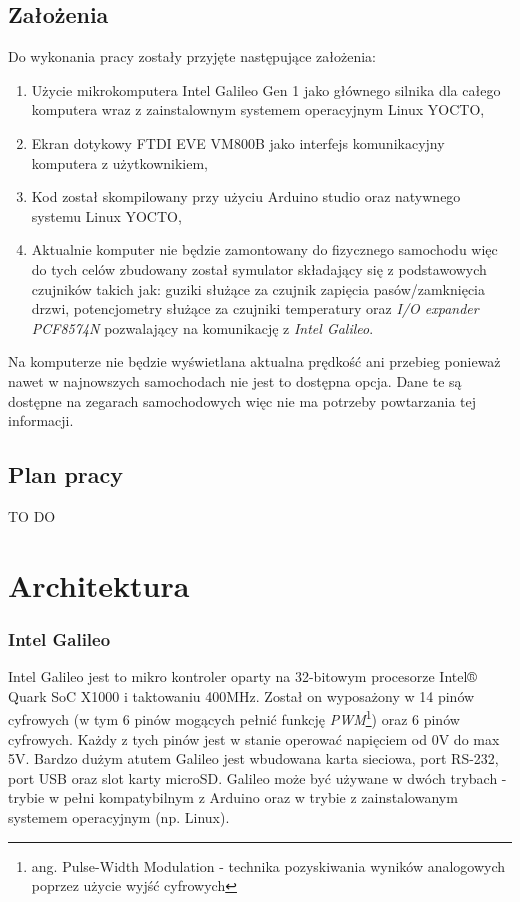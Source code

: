 \documentclass{xmgr}
\begin{document}
\section{Założenia}
Do wykonania pracy zostały przyjęte następujące założenia:
\begin{enumerate}
\item Użycie mikrokomputera Intel Galileo Gen 1 jako głównego silnika dla całego komputera wraz z zainstalownym systemem operacyjnym Linux YOCTO, 
\item Ekran dotykowy FTDI EVE VM800B jako interfejs komunikacyjny komputera z użytkownikiem, 
\item Kod został skompilowany przy użyciu Arduino studio oraz natywnego systemu Linux YOCTO,
\item Aktualnie komputer nie będzie zamontowany do fizycznego samochodu więc do tych celów zbudowany został symulator składający się z podstawowych czujników takich jak: guziki służące za czujnik zapięcia pasów/zamknięcia drzwi, potencjometry służące za czujniki temperatury oraz \emph{I/O expander PCF8574N} pozwalający na komunikację z \emph{Intel Galileo}.
\end{enumerate}

Na komputerze nie będzie wyświetlana aktualna prędkość ani przebieg ponieważ nawet w najnowszych samochodach nie jest to dostępna opcja. Dane te są dostępne na zegarach samochodowych więc nie ma potrzeby powtarzania tej informacji.

\section{Plan pracy}
TO DO


\chapter{Architektura}
\subsection{Intel Galileo}
Intel Galileo jest  to mikro kontroler oparty na 32-bitowym procesorze Intel® Quark SoC X1000 i taktowaniu 400MHz. Został on wyposażony w 14 pinów cyfrowych (w tym 6 pinów mogących pełnić funkcję \emph{PWM}\footnote{ang. Pulse-Width Modulation - technika pozyskiwania wyników analogowych poprzez użycie wyjść cyfrowych}) oraz 6 pinów cyfrowych. Każdy z tych pinów jest w stanie operować napięciem od 0V do max 5V. Bardzo dużym atutem Galileo jest wbudowana karta sieciowa, port RS-232, port USB oraz slot karty microSD. Galileo może być używane w dwóch trybach - trybie w pełni kompatybilnym z Arduino oraz w trybie z zainstalowanym systemem operacyjnym (np. Linux).\cite{GalileoBook}
\end{document}
